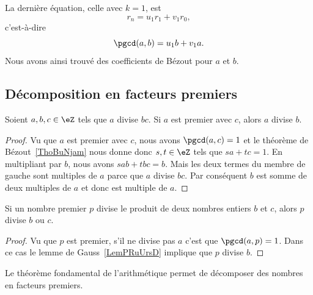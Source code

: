 La dernière équation, celle avec \( k=1\), est
\begin{equation}
    r_n=u_1r_1+v_1r_0,
\end{equation}
c'est-à-dire
\begin{equation}        \label{EqNDMLooDvaiAc}
    \pgcd(a,b)=u_1b+v_1a.
\end{equation}
Nous avons ainsi trouvé des coefficients de Bézout pour $a$ et $b$.


\subsection{Décomposition en facteurs premiers}

\begin{lemma}    \label{LemPRuUrsD}
    Soient \( a,b,c\in \eZ\) tels que \( a\) divise \( bc\). Si \( a\) est premier avec \( c\), alors \( a\) divise \( b\).
\end{lemma}

\begin{proof}
    Vu que \( a\) est premier avec \( c\), nous avons \( \pgcd(a,c)=1\) et le théorème de Bézout~\ref{ThoBuNjam} nous donne donc \( s,t\in \eZ\) tels que \( sa+tc=1\). En multipliant par \( b\), nous avons $sab+tbc=b$. Mais les deux termes du membre de gauche sont multiples de \( a\) parce que \( a\) divise \( bc\). Par conséquent \( b\) est somme de deux multiples de \( a\) et donc est multiple de \( a\).
\end{proof}

\begin{lemma}       \label{LemAXINooOeuMJZ}
    Si un nombre premier $p$ divise le produit de deux nombres entiers $b$ et $c$, alors $p$ divise $b$ ou $c$.
\end{lemma}

\begin{proof}
    Vu que \( p\) est premier, s'il ne divise pas \( a\) c'est que \( \pgcd(a,p)=1\). Dans ce cas le lemme de Gauss~\ref{LemPRuUrsD} implique que \( p\) divise \( b\).
\end{proof}

Le théorème fondamental de l'arithmétique permet de décomposer des nombres en facteurs premiers.

